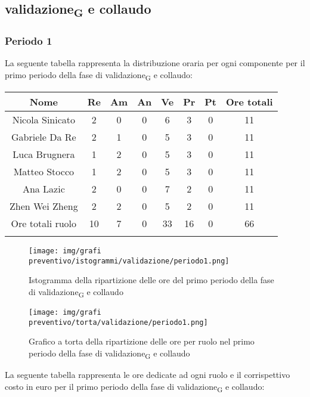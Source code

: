 \newpage
\subsection{validazione\textsubscript{G} e collaudo}

\subsubsection{Periodo 1}
%
La seguente tabella rappresenta la distribuzione oraria per ogni componente per il primo periodo della fase di validazione\textsubscript{G} e collaudo:

	\setlength\extrarowheight{5pt}
	\begin{tabularx}{\textwidth}{|ccccccc|c|}
		\hline
		\rowcolor{white}
		\textbf{Nome} & \textbf{Re} & \textbf{Am} & \textbf{An} & \textbf{Ve} & \textbf{Pr}& \textbf{Pt} & \textbf{Ore totali} \\
		\hline
		Nicola Sinicato &2&0&0&6&3&0&11 \\
		Gabriele Da Re &2&1&0&5&3&0&11 \\
		Luca Brugnera &1&2&0&5&3&0&11 \\
		Matteo Stocco &1&2&0&5&3&0&11 \\
		Ana Lazic &2&0&0&7&2&0&11 \\
		Zhen Wei Zheng &2&2&0&5&2&0&11 \\
		\hline
		Ore totali ruolo &10&7&0&33&16&0&66 \\
		\hline
		\rowcolor{white}
		\caption{Distribuzione oraria durante  il primo periodo di validazione\textsubscript{G} e collaudo per ruolo e persona}
	\end{tabularx}
	\vspace{10pt}
	
\begin{figure}[H]
    \centering
    \texttt{[image: img/grafi preventivo/istogrammi/validazione/periodo1.png]}
    \caption{Istogramma della ripartizione delle ore del primo periodo della fase di validazione\textsubscript{G} e collaudo}
\end{figure}
\begin{figure}[H]
    \centering
    \texttt{[image: img/grafi preventivo/torta/validazione/periodo1.png]}
    \caption{Grafico a torta della ripartizione delle ore per ruolo nel primo periodo della fase di validazione\textsubscript{G} e collaudo}
\end{figure}
La seguente tabella rappresenta le ore dedicate ad ogni ruolo e il corrispettivo costo in euro per il primo periodo della fase di validazione\textsubscript{G} e collaudo:

